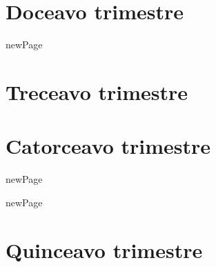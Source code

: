 \documentclass{book}
\begin{document}
\part{Doceavo trimestre}

\begin{htmlDiv}{newPage}
	
\end{htmlDiv}

\part{Treceavo trimestre}

\part{Catorceavo trimestre}

\begin{htmlDiv}{newPage}
	
\end{htmlDiv}

\begin{htmlDiv}{newPage}
	
\end{htmlDiv}

\part{Quinceavo trimestre}
\end{document}
